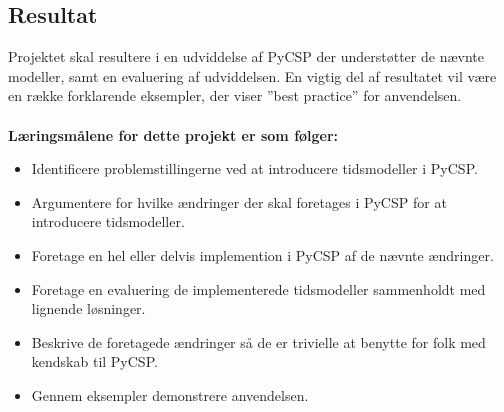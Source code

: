
\subsection*{Resultat}
Projektet skal resultere i en udviddelse af PyCSP der understøtter de nævnte modeller, samt en evaluering af udviddelsen. En vigtig del af resultatet vil være en række forklarende eksempler, der viser ''best practice'' for anvendelsen.
\\
\\
\textbf{Læringsmålene for dette projekt er som følger:}

\begin{itemize}
 \item Identificere problemstillingerne ved at introducere tidsmodeller i PyCSP.
 \item Argumentere for hvilke ændringer  der skal foretages i PyCSP for at introducere tidsmodeller.
 \item Foretage en hel eller delvis implemention i PyCSP af de nævnte ændringer.
 \item Foretage en evaluering de implementerede tidsmodeller sammenholdt med lignende løsninger.
 \item Beskrive de foretagede ændringer så de er trivielle at benytte for folk med kendskab til PyCSP.
 \item Gennem eksempler demonstrere anvendelsen.
\end{itemize}

